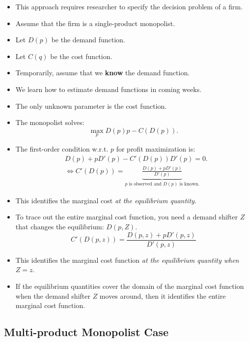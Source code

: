 \documentclass[
]{book}
\begin{document}
\begin{itemize}
\item
  This approach requires researcher to specify the decision problem of a firm.
\item
  Assume that the firm is a single-product monopolist.
\item
  Let \(D(p)\) be the demand function.
\item
  Let \(C(q)\) be the cost function.
\item
  Temporarily, assume that we \textbf{know} the demand function.
\item
  We learn how to estimate demand functions in coming weeks.
\item
  The only unknown parameter is the cost function.
\item
  The monopolist solves:
  \begin{equation}
  \max_{p} D(p)p - C(D(p)).
  \end{equation}
\item
  The first-order condition w.r.t. \(p\) for profit maximization is:
  \begin{equation}
  \begin{split}
  &D(p) + pD'(p) - C'(D(p)) D'(p) = 0.\\
  &\Leftrightarrow C'(D(p)) = \underbrace{\frac{D(p) + pD'(p)}{D'(p)}}_{\text{$p$ is observed and $D(p)$ is known.}}
  \end{split}
  \end{equation}
\item
  This identifies the marginal cost \textit{at the equilibrium quantity}.
\item
  To trace out the entire marginal cost function, you need a demand shifter \(Z\) that changes the equilibrium: \(D(p, Z)\).
  \begin{equation}
  C'(D(p, z)) = \frac{D(p, z) + pD'(p, z)}{D'(p, z)}
  \end{equation}
\item
  This identifies the marginal cost function \textit{at the equilibrium quantity when $Z = z$}.
\item
  If the equilibrium quantities cover the domain of the marginal cost function when the demand shifter \(Z\) moves around, then it identifies the entire marginal cost function.
\end{itemize}

\hypertarget{multi-product-monopolist-case}{%
\subsection{Multi-product Monopolist Case}\label{multi-product-monopolist-case}}
\end{document}
